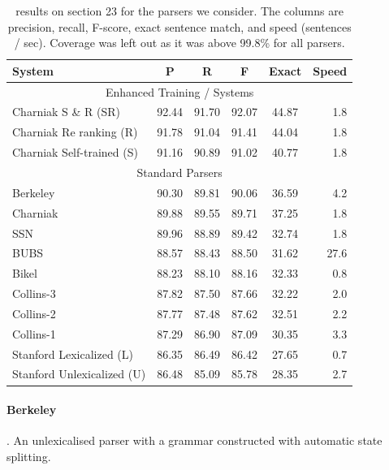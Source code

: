 \begin{table}
\begin{center}
\begin{tabular}{|lccccr|}
	\hline
		System & P & R & F & Exact & Speed \\
	\hline
	\hline
		\multicolumn{6}{|c|}{Enhanced Training / Systems} \\
		Charniak S \& R (SR)       & 92.44 & 91.70 & 92.07 & 44.87 & 1.8 \\
		Charniak Re ranking (R)     & 91.78 & 91.04 & 91.41 & 44.04 & 1.8 \\
		Charniak Self-trained (S)  & 91.16 & 90.89 & 91.02 & 40.77 & 1.8 \\
	\hline
		\multicolumn{6}{|c|}{Standard Parsers} \\
		Berkeley                   & 90.30 & 89.81 & 90.06 & 36.59 & 4.2 \\
		Charniak                   & 89.88 & 89.55 & 89.71 & 37.25 & 1.8 \\
		SSN                        & 89.96 & 88.89 & 89.42 & 32.74 & 1.8 \\
		BUBS                       & 88.57 & 88.43 & 88.50 & 31.62 & 27.6 \\
		Bikel                      & 88.23 & 88.10 & 88.16 & 32.33 & 0.8 \\
		Collins-3                  & 87.82 & 87.50 & 87.66 & 32.22 & 2.0 \\
		Collins-2                  & 87.77 & 87.48 & 87.62 & 32.51 & 2.2 \\
		Collins-1                  & 87.29 & 86.90 & 87.09 & 30.35 & 3.3 \\
		Stanford Lexicalized (L)   & 86.35 & 86.49 & 86.42 & 27.65 & 0.7 \\
		Stanford Unlexicalized (U) & 86.48 & 85.09 & 85.78 & 28.35 & 2.7 \\
	\hline
\end{tabular}
\caption[\parseval results on \wsj section 23 for the parsers we consider.]{ \label{tab:standard-results} 
	\parseval results on \wsj section 23 for the parsers we consider.
  The columns are precision, recall, F-score, exact sentence match, and speed (sentences / sec).
  Coverage was left out as it was above 99.8\% for all parsers.
}
\end{center}
\end{table}

\paragraph{Berkeley} \parencite{Petrov-etal:2006,Petrov-Klein:2007}.
An unlexicalised parser with a grammar constructed with automatic state splitting.

